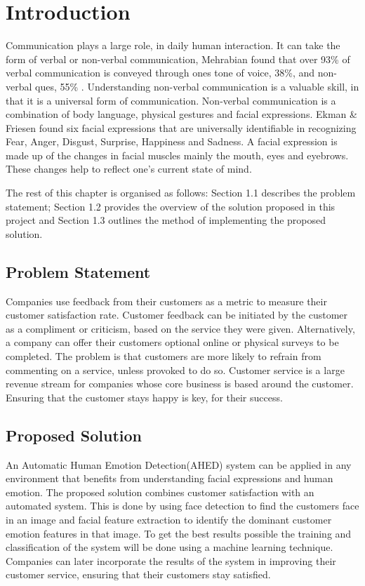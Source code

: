 ﻿
\chapter{Introduction}


Communication plays a large role, in daily human interaction. It can take the form of verbal or non-verbal communication, Mehrabian found that over 93\% of verbal communication is conveyed through ones tone of voice, 38\%,  and non-verbal ques, 55\% \cite{mehrabian}. Understanding non-verbal communication is a valuable skill, in that it is a universal form of communication. 
Non-verbal communication is a combination of body language, physical gestures and facial expressions. Ekman \& Friesen found six facial expressions that are universally identifiable in recognizing Fear, Anger, Disgust, Surprise, Happiness and Sadness\cite{ekman}. A facial expression is made up of the changes in facial muscles mainly the mouth, eyes and eyebrows. These changes help to reflect one’s current state of mind. 

The rest of this chapter is organised as follows: Section 1.1 describes the problem statement; Section 1.2 provides the overview of the solution proposed in this project and Section 1.3 outlines the method of implementing the proposed solution.

\section{Problem Statement}
Companies use feedback from their customers as a metric to measure their customer satisfaction rate. Customer feedback can be initiated by the customer as a compliment or criticism, based on the service they were given. Alternatively, a company can offer their customers optional online or physical surveys to be completed. The problem is that customers are more likely to refrain from commenting on a service, unless provoked to do so. Customer service is a large revenue stream for companies whose core business is based around the customer. Ensuring that the customer stays happy is key, for their success. 

\section{Proposed Solution}
An Automatic Human Emotion Detection(AHED) system can be applied in any environment that benefits from understanding facial expressions and human emotion.
The proposed solution combines customer satisfaction with an automated system. This is done by using face detection to find the customers face in an image and facial feature extraction to identify the dominant customer emotion features in that image. To get the best results possible the training and classification of the system will be done using a machine learning technique. Companies can later incorporate the results of the system in improving their customer service, ensuring that their customers stay satisfied.

